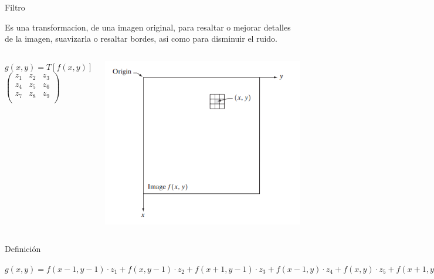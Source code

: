 \documentclass{beamer}
\begin{document}
\begin{frame}{Filtro}

Es una transformacion, de una imagen original, para resaltar o mejorar detalles de la imagen, suavizarla o resaltar bordes, asi como para disminuir el ruido. 
\begin{columns}
\column[t]{5cm}
\begin{center}
\begin{math}
g(x,y) = T[f(x,y)] 
\end{math}\\

\begin{math}
\begin{pmatrix}
	z_1 & z_2 & z_3 \\
    z_4 & z_5 & z_6 \\
    z_7 & z_8 & z_9 \\
\end{pmatrix}
\end{math}
\end{center}

\column[t]{5cm}

\includegraphics[scale=0.25]{./.Presentation/filter.png}

\end{columns}

\begin{block}{Definición}
\begin{center}
\begin{math}
	g(x,y) = f(x-1,y-1)\cdot z_1 + f(x, y-1) \cdot z_2 + f(x+1,y-1)\cdot z_3 + f(x-1, y) \cdot z_4 + f(x,y) \cdot z_5 + f(x+1,y) \cdot z_6 + f(x-1, y+1) \cdot z_7 + f(x, y+1) \cdot z_8 + f(x+1, y+1) \cdot z_9
\end{math}
\end{center}
\end{block}
\end{frame}
\end{document}
